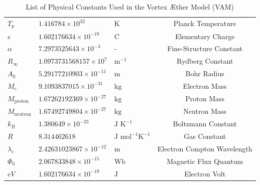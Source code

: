 \documentclass[a4paper,10pt]{article}
\begin{document}
\begin{table}[h]
\begin{tabular}{lllc}
            $T_p$ & $1.416784 \times 10^{32}$ & $\text{K}$ & Planck Temperature \\
            $e$ & $1.602176634 \times 10^{-19}$ & $\text{C}$ & Elementary Charge \\
            $\alpha$ & $7.2973525643 \times 10^{-3}$ & - & Fine-Structure Constant \\
            $R_\infty$ & $1.0973731568157 \times 10^7$ & $\text{m}^{-1}$ & Rydberg Constant \\
            $A_0$ & $5.29177210903 \times 10^{-11}$ & $\text{m}$ & Bohr Radius \\
            $M_e$ & $9.1093837015 \times 10^{-31}$ & $\text{kg}$ & Electron Mass \\
            $M_{\text{proton}}$ & $1.67262192369 \times 10^{-27}$ & $\text{kg}$ & Proton Mass \\
            $M_{\text{neutron}}$ & $1.67492749804 \times 10^{-27}$ & $\text{kg}$ & Neutron Mass \\
            $k_B$ & $1.380649 \times 10^{-23}$ & $\text{J K}^{-1}$ & Boltzmann Constant \\
            $R$ & $8.314462618$ & $\text{J mol}^{-1} \text{K}^{-1}$ & Gas Constant \\
            $\lambda_c$ & $2.42631023867 \times 10^{-12}$ & $\text{m}$ & Electron Compton Wavelength \\
            $\Phi_0$ & $2.067833848 \times 10^{-15}$ & $\text{Wb}$ & Magnetic Flux Quantum \\
            $eV$ & $1.602176634 \times 10^{-19}$ & $\text{J}$ & Electron Volt \\
            \bottomrule
        \end{tabular}
        \caption{List of Physical Constants Used in the Vortex \AE ther Model (VAM)}
        \label{tab:vam_constants}
    \end{table}
\end{document}
